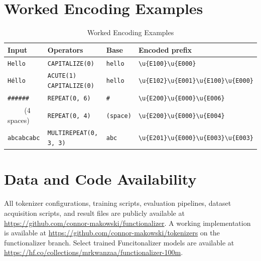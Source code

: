 \documentclass{article}
\begin{document}
\section{Worked Encoding Examples}
\label{sec:appendix_examples}

\begin{table}[htbp]
\centering
\caption{Worked Encoding Examples}
\label{tab:encoding_examples}
\begin{tabular}{llll}
\toprule
\textbf{Input} & \textbf{Operators} & \textbf{Base} & \textbf{Encoded prefix} \\
\midrule
\texttt{Hello} & \texttt{CAPITALIZE(0)} & \texttt{hello} & \texttt{\textbackslash u\{E100\}\textbackslash u\{E000\}} \\
\texttt{H\'{e}llo} & \texttt{ACUTE(1) CAPITALIZE(0)} & \texttt{hello} & \texttt{\textbackslash u\{E102\}\textbackslash u\{E001\}\textbackslash u\{E100\}\textbackslash u\{E000\}} \\
\texttt{\#\#\#\#\#\#} & \texttt{REPEAT(0, 6)} & \texttt{\#} & \texttt{\textbackslash u\{E200\}\textbackslash u\{E000\}\textbackslash u\{E006\}} \\
\texttt{\ \ \ \ } (4 spaces) & \texttt{REPEAT(0, 4)} & \texttt{(space)} & \texttt{\textbackslash u\{E200\}\textbackslash u\{E000\}\textbackslash u\{E004\}} \\
\texttt{abcabcabc} & \texttt{MULTIREPEAT(0, 3, 3)} & \texttt{abc} & \texttt{\textbackslash u\{E201\}\textbackslash u\{E000\}\textbackslash u\{E003\}\textbackslash u\{E003\}} \\
\bottomrule
\end{tabular}
\end{table}

\section*{Data and Code Availability}

All tokenizer configurations, training scripts, evaluation pipelines, dataset acquisition scripts, and result files are publicly available at \url{https://github.com/connor-makowski/functionalizer}. A working implementation is available at \url{https://github.com/connor-makowski/tokenizers} on the functionalizer branch. Select trained Funcitonalizer models are available at \url{https://hf.co/collections/mrkwanzaa/functionalizer-100m}.
\end{document}
